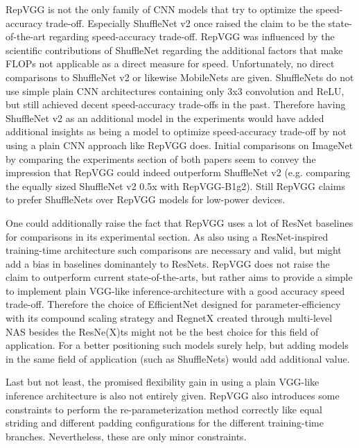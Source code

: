 RepVGG is not the only family of CNN models that try to optimize the speed-accuracy trade-off. Especially ShuffleNet v2 once raised the claim to be the state-of-the-art regarding speed-accuracy trade-off. RepVGG was influenced by the scientific contributions of ShuffleNet regarding the additional factors that make FLOPs not applicable as a direct measure for speed. Unfortunately, no direct comparisons to ShuffleNet v2 or likewise MobileNets are given. ShuffleNets do not use simple plain CNN architectures containing only 3x3 convolution and ReLU, but still achieved decent speed-accuracy trade-offs in the past. Therefore having ShuffleNet v2 as an additional model in the experiments would have added additional insights as being a model to optimize speed-accuracy trade-off by not using a plain CNN approach like RepVGG does. Initial comparisons on ImageNet by comparing the experiments section of both papers seem to convey the impression that RepVGG could indeed outperform ShuffleNet v2 (e.g. comparing the equally sized ShuffleNet v2 0.5x with RepVGG-B1g2). Still RepVGG claims to prefer ShuffleNets over RepVGG models for low-power devices. 

One could additionally raise the fact that RepVGG uses a lot of ResNet baselines for comparisons in its experimental section. As also using a ResNet-inspired training-time architecture such comparisons are necessary and valid, but might add a bias in baselines dominantely to ResNets. RepVGG does not raise the claim to outperform current state-of-the-arts, but rather aims to provide a simple to implement plain VGG-like inference-architecture with a good accuracy speed trade-off. Therefore the choice of EfficientNet designed for parameter-efficiency with its compound scaling strategy and RegnetX created through multi-level NAS besides the ResNe(X)ts might not be the best choice for this field of application. For a better positioning such models surely help, but adding models in the same field of application (such as ShuffleNets) would add additional value.

Last but not least, the promised flexibility gain in using a plain VGG-like inference architecture is also not entirely given. RepVGG also introduces some constraints to perform the re-parameterization method correctly like equal striding and different padding configurations for the different training-time branches. Nevertheless, these are only minor constraints. 
